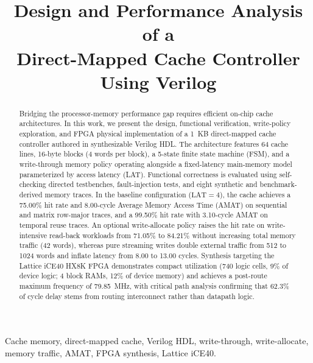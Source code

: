 \documentclass[conference]{IEEEtran}
\begin{document}
\title{Design and Performance Analysis of a\\Direct-Mapped Cache Controller Using Verilog}

\author{
}

\maketitle

\begin{abstract}
Bridging the processor-memory performance gap requires efficient on-chip cache architectures. In this work, we present the design, functional verification, write-policy exploration, and FPGA physical implementation of a 1~KB direct-mapped cache controller authored in synthesizable Verilog HDL. The architecture features 64 cache lines, 16-byte blocks (4 words per block), a 5-state finite state machine (FSM), and a write-through memory policy operating alongside a fixed-latency main-memory model parameterized by access latency (LAT). Functional correctness is evaluated using self-checking directed testbenches, fault-injection tests, and eight synthetic and benchmark-derived memory traces. In the baseline configuration ($\text{LAT}=4$), the cache achieves a 75.00\% hit rate and 8.00-cycle Average Memory Access Time (AMAT) on sequential and matrix row-major traces, and a 99.50\% hit rate with 3.10-cycle AMAT on temporal reuse traces. An optional write-allocate policy raises the hit rate on write-intensive read-back workloads from 71.05\% to 84.21\% without increasing total memory traffic (42 words), whereas pure streaming writes double external traffic from 512 to 1024 words and inflate latency from 8.00 to 13.00 cycles. Synthesis targeting the Lattice iCE40 HX8K FPGA demonstrates compact utilization (740 logic cells, 9\% of device logic; 4 block RAMs, 12\% of device memory) and achieves a post-route maximum frequency of 79.85~MHz, with critical path analysis confirming that 62.3\% of cycle delay stems from routing interconnect rather than datapath logic.
\end{abstract}

\begin{IEEEkeywords}
Cache memory, direct-mapped cache, Verilog HDL, write-through, write-allocate, memory traffic, AMAT, FPGA synthesis, Lattice iCE40.
\end{IEEEkeywords}
\end{document}
